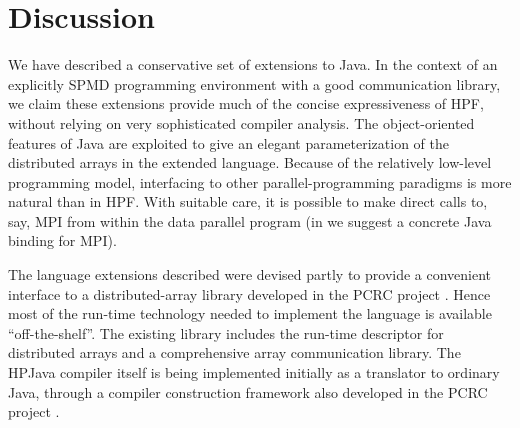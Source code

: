 
\section{Discussion}

We have described a conservative set of extensions to Java.  In the
context of an explicitly SPMD programming environment with a good
communication library, we claim these extensions provide much of the
concise expressiveness of HPF, without relying on very sophisticated
compiler analysis.  The object-oriented features of Java are exploited
to give an elegant parameterization of the distributed arrays in the
extended language.  Because of the relatively low-level programming
model, interfacing to other parallel-programming paradigms is more
natural than in HPF.  With suitable care, it is possible to make direct
calls to, say, MPI from within the data parallel program (in
\cite{JavaMPI} we suggest a concrete Java binding for MPI).

The language extensions described were devised partly to
provide a convenient interface to a distributed-array library
developed in the PCRC project \cite{Common_runtime,NPAC_PCRC_kernel}.
Hence most of the run-time technology needed to implement the language
is available ``off-the-shelf''.  The existing library includes the run-time
descriptor for distributed arrays and a comprehensive array
communication library.  The HPJava compiler itself is being implemented
initially as a translator to ordinary Java, through a compiler
construction framework also developed in the PCRC project
\cite{PCRC_based}.

